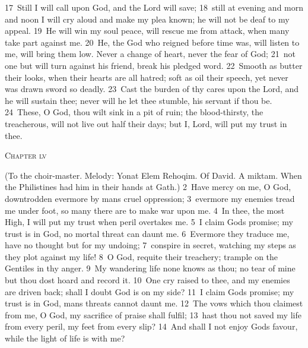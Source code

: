 \documentclass[10pt]{book} %
\begin{document}
\textcolor{benred8}{17}~Still I will call upon God, and the Lord will save; \textcolor{benred8}{18}~still at evening and morn and noon I will cry aloud and make my plea known; he will not be deaf to my appeal. \textcolor{benred8}{19}~He will win my soul peace, will rescue me from attack, when many take part against me. \textcolor{benred8}{20}~He, the God who reigned before time was, will listen to me, will bring them low. Never a change of heart, never the fear of God; \textcolor{benred8}{21}~not one but will turn against his friend, break his pledged word. \textcolor{benred8}{22}~Smooth as butter their looks, when their hearts are all hatred; soft as oil their speech, yet never was drawn sword so deadly.
\textcolor{benred8}{23}~Cast the burden of thy cares upon the Lord, and he will sustain thee; never will he let thee stumble, his servant if thou be. \textcolor{benred8}{24}~These, O God, thou wilt sink in a pit of ruin; the blood-thirsty, the treacherous, will not live out half their days; but I, Lord, will put my trust in thee.
\begin{large}\begin{center}\textsc{Chapter lv}\end{center}\end{large}
(To the choir-master. Melody: Yonat Elem Rehoqim. Of David. A miktam. When the Philistines had him in their hands at Gath.)
\textcolor{benred8}{2}~Have mercy on me, O God, downtrodden evermore by man\textquotesingle s cruel oppression; \textcolor{benred8}{3}~evermore my enemies tread me under foot, so many there are to make war upon me. \textcolor{benred8}{4}~In thee, the most High, I will put my trust when peril overtakes me. \textcolor{benred8}{5}~I claim God\textquotesingle s promise; my trust is in God, no mortal threat can daunt me. \textcolor{benred8}{6}~Evermore they traduce me, have no thought but for my undoing; \textcolor{benred8}{7}~conspire in secret, watching my steps as they plot against my life! \textcolor{benred8}{8}~O God, requite their treachery; trample on the Gentiles in thy anger. \textcolor{benred8}{9}~My wandering life none knows as thou; no tear of mine but thou dost hoard and record it. \textcolor{benred8}{10}~One cry raised to thee, and my enemies are driven back; shall I doubt God is on my side? \textcolor{benred8}{11}~I claim God\textquotesingle s promise; my trust is in God, man\textquotesingle s threats cannot daunt me. \textcolor{benred8}{12}~The vows which thou claimest from me, O God, my sacrifice of praise shall fulfil; \textcolor{benred8}{13}~hast thou not saved my life from every peril, my feet from every slip? \textcolor{benred8}{14}~And shall I not enjoy God\textquotesingle s favour, while the light of life is with me?
\end{document}
